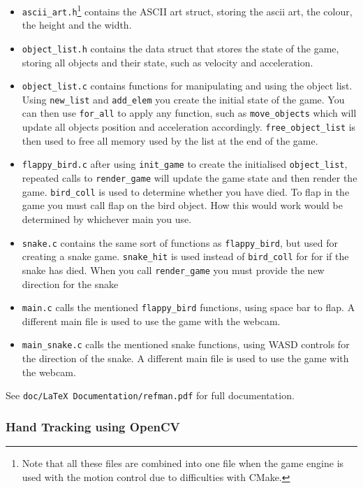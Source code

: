 \documentclass[10pt]{article}
\begin{document}
\begin{itemize}
\item \texttt{ascii\_art.h}\footnote{Note that all these files are combined into one file when the game engine is used with the motion control due to difficulties with CMake.} contains the ASCII art struct, storing the ascii art, the colour, the height and the width.
\item \texttt{object\_list.h} contains the data struct that stores the state of the game, storing all objects and their state, such as velocity and acceleration.
\item \texttt{object\_list.c} contains functions for manipulating and using the object list. Using \texttt{new\_list} and \texttt{add\_elem} you create the initial state of the game. You can then use \texttt{for\_all} to apply any function, such as \texttt{move\_objects} which will update all objects position and acceleration accordingly. \texttt{free\_object\_list} is then used to free all memory used by the list at the end of the game.
\item \texttt{flappy\_bird.c} after using \texttt{init\_game} to create the initialised \texttt{object\_list}, repeated calls to \texttt{render\_game} will update the game state and then render the game. \texttt{bird\_coll} is used to determine whether you have died. To flap in the game you must call flap on the bird object. How this would work would be determined by whichever main you use.
\item \texttt{snake.c} contains the same sort of functions as \texttt{flappy\_bird}, but used for creating a snake game. \texttt{snake\_hit} is used instead of \texttt{bird\_coll} for for if the snake has died. When you call \texttt{render\_game} you must provide the new direction for the snake 
\item \texttt{main.c} calls the mentioned \texttt{flappy\_bird} functions, using space bar to flap. A different main file is used to use the game with the webcam.
\item \texttt{main\_snake.c} calls the mentioned snake functions, using WASD controls for the direction of the snake. A different main file is used to use the game with the webcam.
\end{itemize}

See \texttt{doc/LaTeX Documentation/refman.pdf} for full documentation.

\subsubsection{Hand Tracking using OpenCV}
\end{document}

